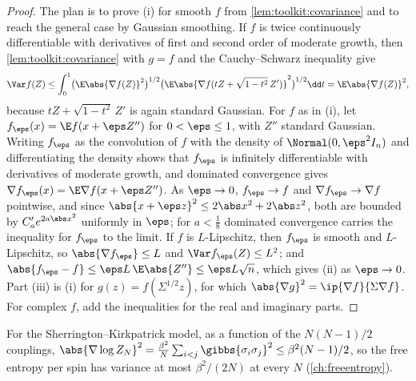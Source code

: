 \begin{refsection}
\begin{proof}
The plan is to prove (i) for smooth $f$ from \cref{lem:toolkit:covariance} and to reach the general case by Gaussian smoothing. If $f$ is twice continuously differentiable with derivatives of first and second order of moderate growth, then \cref{lem:toolkit:covariance} with $g=f$ and the Cauchy--Schwarz inequality give
\[
\Var f(Z)\le\int_0^1\bigl(\E\abs{\nabla f(Z)}^2\bigr)^{1/2}\bigl(\E\abs{\nabla f(tZ+\sqrt{1-t^2}\,Z')}^2\bigr)^{1/2}\dd t=\E\abs{\nabla f(Z)}^2,
\]
because $tZ+\sqrt{1-t^2}\,Z'$ is again standard Gaussian. For $f$ as in (i), let $f_\eps(x)=\E f(x+\eps Z'')$ for $0<\eps\le1$, with $Z''$ standard Gaussian. Writing $f_\eps$ as the convolution of $f$ with the density of $\Normal(0,\eps^2I_n)$ and differentiating the density shows that $f_\eps$ is infinitely differentiable with derivatives of moderate growth, and dominated convergence gives $\nabla f_\eps(x)=\E\nabla f(x+\eps Z'')$. As $\eps\to0$, $f_\eps\to f$ and $\nabla f_\eps\to\nabla f$ pointwise, and since $\abs{x+\eps z}^2\le2\abs x^2+2\abs z^2$, both are bounded by $C_a'e^{2a\abs x^2}$ uniformly in $\eps$; for $a<\frac18$ dominated convergence carries the inequality for $f_\eps$ to the limit. If $f$ is $L$-Lipschitz, then $f_\eps$ is smooth and $L$-Lipschitz, so $\abs{\nabla f_\eps}\le L$ and $\Var f_\eps(Z)\le L^2$; and $\abs{f_\eps-f}\le\eps L\,\E\abs{Z''}\le\eps L\sqrt n$, which gives (ii) as $\eps\to0$. Part (iii) is (i) for $g(z)=f(\Sigma^{1/2}z)$, for which $\abs{\nabla g}^2=\ip{\nabla f}{\Sigma\nabla f}$. For complex $f$, add the inequalities for the real and imaginary parts.
\end{proof}

For the Sherrington--Kirkpatrick model, as a function of the $N(N-1)/2$ couplings, $\abs{\nabla\log Z_N}^2=\frac{\beta^2}N\sum_{i<j}\gibbs{\sigma_i\sigma_j}^2\le\beta^2(N-1)/2$, so the free entropy per spin has variance at most $\beta^2/(2N)$ at every $N$ (\cref{ch:freeentropy}).


\end{refsection}
